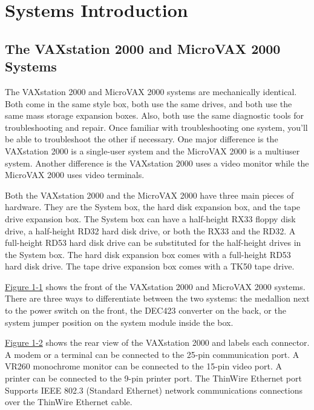 \chapter{Systems Introduction}
\section{The VAXstation 2000 and MicroVAX 2000 Systems}
\pagestyle{main}
\setcounter{page}{1}


The VAXstation 2000 and MicroVAX 2000 systems are mechanically
identical. Both come in the same style box, both use the same drives,
and both use the same mass storage expansion boxes. Also, both use
the same diagnostic tools for troubleshooting and repair. Once familiar
with troubleshooting one system, you'll be able to troubleshoot the other
if necessary. One major difference is the VAXstation 2000 is a single-user
system and the MicroVAX 2000 is a multiuser system. Another difference
is the VAXstation 2000 uses a video monitor while the MicroVAX 2000 uses
video terminals.

Both the VAXstation 2000 and the MicroVAX 2000 have three main pieces
of hardware. They are the System box, the hard disk expansion box, and
the tape drive expansion box. The System box can have a half-height RX33
floppy disk drive, a half-height RD32 hard disk drive, or both the RX33 and
the RD32. A full-height RD53 hard disk drive can be substituted for the 
half-height drives in the System box. The hard disk expansion box comes with a
full-height RD53 hard disk drive. The tape drive expansion box comes with
a TK50 tape drive.

\newpage

\hyperref[figure:1-1]{Figure 1-1} shows the front of the VAXstation 2000 and MicroVAX 2000
systems. There are three ways to differentiate between the two systems:
the medallion next to the power switch on the front, the DEC423 converter
on the back, or the system jumper position on the system module inside
the box.

\label{figure:1-1}

\newpage
\hyperref[figure:1-2]{Figure 1-2} shows the rear view of the VAXstation 2000 and labels each
connector. A modem or a terminal can be connected to the 25-pin 
communication port. A VR260 monochrome monitor can be connected to the
15-pin video port. A printer can be connected to the 9-pin printer port. The
ThinWire Ethernet port Supports IEEE 802.3 (Standard Ethernet) network
communications connections over the ThinWire Ethernet cable.

